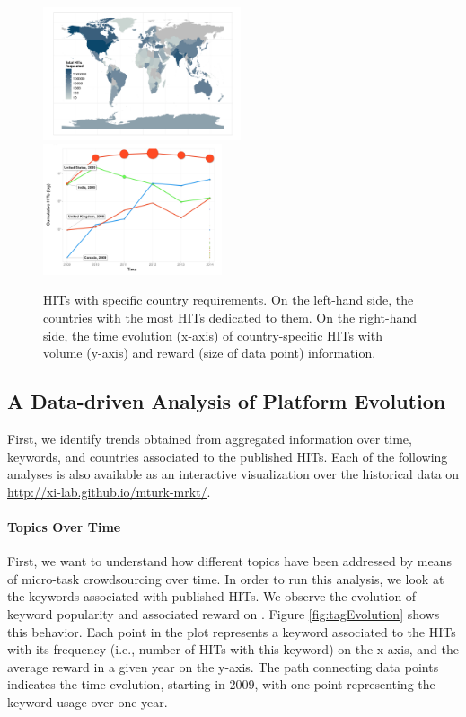 \begin{figure}[tb]
	\centering
		\includegraphics[width=0.52\textwidth]{figures/map}
		\includegraphics[width=0.47\textwidth]{figures/countriesTime}
	\caption{HITs with specific country requirements. On the left-hand side, the countries with the most HITs dedicated to them. On the right-hand side, the time evolution (x-axis) of country-specific HITs with volume (y-axis) and reward (size of data point) information.}
	\label{fig:country}
\end{figure}

\subsection{A Data-driven Analysis of Platform Evolution}
First, we identify trends obtained from aggregated information over time, keywords, and countries associated to the published HITs.  Each of the following analyses is also available as an interactive visualization over the historical data on \url{http://xi-lab.github.io/mturk-mrkt/}.
\paragraph{Topics  Over Time}
First, we want to understand how different topics have been addressed by means of micro-task crowdsourcing over time.
In order to run this analysis, we look at the keywords associated with published HITs. We observe the evolution of keyword popularity and associated reward on \amt{}. 
Figure \ref{fig:tagEvolution} shows this behavior. Each point in the plot represents a keyword associated to the HITs with its frequency (i.e., number of HITs with this keyword) on the x-axis, and the average reward in a given year on the y-axis. The path connecting data points indicates the time evolution, starting in 2009, with one point representing the keyword usage over one year.

